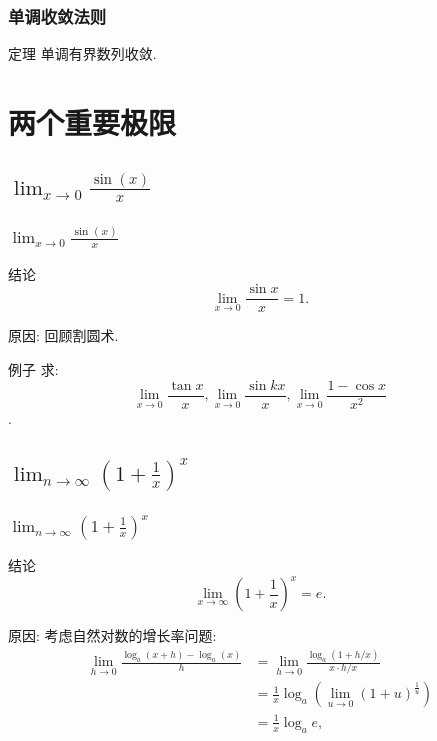 \documentclass[
10pt,  
aspectratio=43,  
]{beamer}
\begin{document}
\begin{frame}
	\frametitle{单调收敛法则}
	\begin{block}{定理}
		单调有界数列收敛.
	\end{block}
	
\end{frame}

\section{两个重要极限}
\subsection{$\lim_{x\to0}\frac{\sin(x)}{x}$}

\begin{frame}
	\frametitle{$\lim_{x\to0}\frac{\sin(x)}{x}$}
	\begin{block}{结论}
		$$
		\lim _{x \rightarrow 0} \frac{\sin x}{x}=1.
		$$
	\end{block}
	原因: 回顾割圆术.
	
	\begin{exampleblock}{例子}
		求:  $$\displaystyle\lim _{x \rightarrow 0} \frac{\tan x}{x},   \lim_{x \rightarrow 0} \frac{\sin k x}{x},   \lim _{x\rightarrow 0} \frac{1-\cos x}{x^2}$$.
	\end{exampleblock}
	
\end{frame}

\subsection{$\lim_{n\to\infty}\left(1+\frac1x\right)^x$}

\begin{frame}
	\frametitle{$\lim_{n\to\infty}\left(1+\frac1x\right)^x$}
	\begin{block}{结论}
		$$
		\lim _{x \rightarrow \infty}\left(1+\frac{1}{x}\right)^x=e.
		$$
	\end{block}
	原因: 考虑自然对数的增长率问题: 
	\begin{equation*}
		\begin{aligned}
			\lim _{h \rightarrow 0} \frac{\log _a(x+h)-\log _a(x)}{h} & =\lim _{h \rightarrow 0} \frac{\log _a(1+h / x)}{x \cdot h / x}             \\
			                                                          & =\frac{1}{x} \log _a\left(\lim _{u \rightarrow 0}(1+u)^{\frac{1}{u}}\right) \\
			                                                          & =\frac{1}{x} \log _a e,                                                     
		\end{aligned}
	\end{equation*}
\end{frame}
\end{document}
